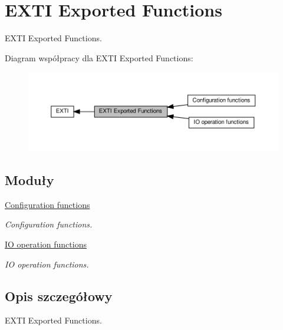 \hypertarget{group___e_x_t_i___exported___functions}{}\section{E\+X\+TI Exported Functions}
\label{group___e_x_t_i___exported___functions}


E\+X\+TI Exported Functions.  


Diagram współpracy dla E\+X\+TI Exported Functions\+:\nopagebreak
\begin{figure}[H]
\begin{center}
\leavevmode
\includegraphics[width=350pt]{group___e_x_t_i___exported___functions}
\end{center}
\end{figure}
\subsection*{Moduły}
\begin{DoxyCompactItemize}
\item 
\hyperlink{group___e_x_t_i___exported___functions___group1}{Configuration functions}
\begin{DoxyCompactList}\small\item\em Configuration functions. \end{DoxyCompactList}\item 
\hyperlink{group___e_x_t_i___exported___functions___group2}{I\+O operation functions}
\begin{DoxyCompactList}\small\item\em IO operation functions. \end{DoxyCompactList}\end{DoxyCompactItemize}


\subsection{Opis szczegółowy}
E\+X\+TI Exported Functions. 

